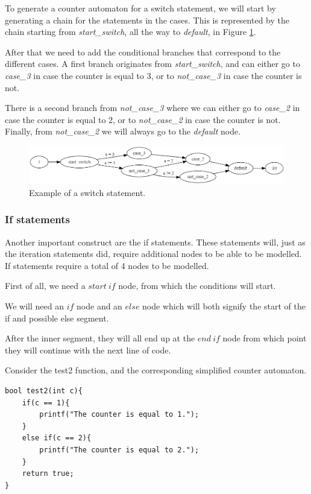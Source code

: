 \documentclass[12pt]{article}
\begin{document}
To generate a counter automaton for a switch statement, we will start by generating a chain for the statements in the cases. This is represented by the chain starting from \textit{start\_switch}, all the way to \textit{default}, in Figure \ref{fig:counter_switch}.

After that we need to add the conditional branches that correspond to the different cases. A first branch originates from \textit{start\_switch}, and can either go to \textit{case\_3} in case the counter is equal to 3, or to \textit{not\_case\_3} in case the counter is not.

There is a second branch from \textit{not\_case\_3} where we can either go to \textit{case\_2} in case the counter is equal to 2, or to \textit{not\_case\_2} in case the counter is not. Finally, from \textit{not\_case\_2} we will always go to the \textit{default} node.

\begin{figure}[h]
	\centering
	\includegraphics[width=\linewidth]{counter_switch}
	\caption{Example of a switch statement.}
	\label{fig:counter_switch}
\end{figure}
\subsubsection{If statements}
\label{sec:if}
Another important construct are the if statements. These statements will, just as the iteration statements did, require additional nodes to be able to be modelled. If statements require a total of 4 nodes to be modelled.

First of all, we need a $start\ if$ node, from which the conditions will start.

We will need an $if$ node and an $else$ node which will both signify the start of the if and possible else segment.

After the inner segment, they will all end up at the $end\ if$ node from which point they will continue with the next line of code.

Consider the test2 function, and the corresponding simplified counter automaton.
\begin{lstlisting}[style=CStyle]
bool test2(int c){
	if(c == 1){
		printf("The counter is equal to 1.");
	}
	else if(c == 2){
		printf("The counter is equal to 2.");
	}
	return true;
}
\end{lstlisting}
\end{document}
